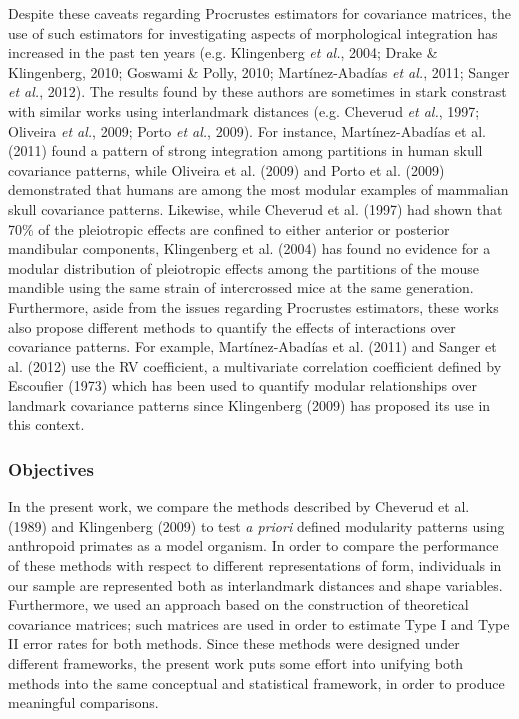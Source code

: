 \documentclass[12pt,twoside]{report}
\begin{document}
Despite these caveats regarding Procrustes estimators for covariance
matrices, the use of such estimators for investigating aspects of
morphological integration has increased in the past ten years (e.g.
Klingenberg \emph{et al.}, 2004; Drake \& Klingenberg, 2010; Goswami \&
Polly, 2010; Martínez-Abadías \emph{et al.}, 2011; Sanger \emph{et al.},
2012). The results found by these authors are sometimes in stark
constrast with similar works using interlandmark distances (e.g.
Cheverud \emph{et al.}, 1997; Oliveira \emph{et al.}, 2009; Porto
\emph{et al.}, 2009). For instance, Martínez-Abadías et al. (2011) found
a pattern of strong integration among partitions in human skull
covariance patterns, while Oliveira et al. (2009) and Porto et al.
(2009) demonstrated that humans are among the most modular examples of
mammalian skull covariance patterns. Likewise, while Cheverud et al.
(1997) had shown that 70\% of the pleiotropic effects are confined to
either anterior or posterior mandibular components, Klingenberg et al.
(2004) has found no evidence for a modular distribution of pleiotropic
effects among the partitions of the mouse mandible using the same strain
of intercrossed mice at the same generation. Furthermore, aside from the
issues regarding Procrustes estimators, these works also propose
different methods to quantify the effects of interactions over
covariance patterns. For example, Martínez-Abadías et al. (2011) and
Sanger et al. (2012) use the RV coefficient, a multivariate correlation
coefficient defined by Escoufier (1973) which has been used to quantify
modular relationships over landmark covariance patterns since
Klingenberg (2009) has proposed its use in this context.

\subsubsection{Objectives}\label{objectives}

In the present work, we compare the methods described by Cheverud et al.
(1989) and Klingenberg (2009) to test \emph{a priori} defined modularity
patterns using anthropoid primates as a model organism. In order to
compare the performance of these methods with respect to different
representations of form, individuals in our sample are represented both
as interlandmark distances and shape variables. Furthermore, we used an
approach based on the construction of theoretical covariance matrices;
such matrices are used in order to estimate Type I and Type II error
rates for both methods. Since these methods were designed under
different frameworks, the present work puts some effort into unifying
both methods into the same conceptual and statistical framework, in
order to produce meaningful comparisons.
\end{document}
